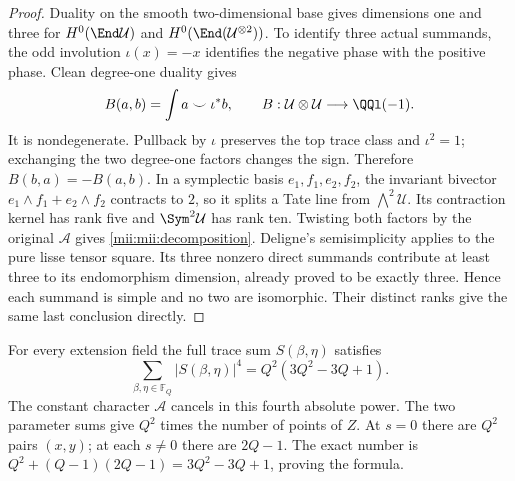 \begin{proof}
Duality on the smooth two-dimensional base gives dimensions one and
three for $H^0(\End\mathcal U)$ and
$H^0(\End(\mathcal U^{\otimes2}))$. To identify three actual
summands, the odd involution $\iota(x)=-x$ identifies the negative
phase with the positive phase. Clean degree-one duality gives
\[
 B(a,b)=\int a\smile\iota^*b,
 \qquad B:\mathcal U\otimes\mathcal U\longrightarrow\QQl(-1).
\]
It is nondegenerate. Pullback by $\iota$ preserves the top trace class
and $\iota^2=1$; exchanging the two degree-one factors changes the
sign. Therefore $B(b,a)=-B(a,b)$. In a symplectic basis
$e_1,f_1,e_2,f_2$, the invariant bivector
$e_1\wedge f_1+e_2\wedge f_2$ contracts to $2$, so it splits a
Tate line from $\bigwedge^2\mathcal U$. Its contraction kernel has
rank five and $\Sym^2\mathcal U$ has rank ten. Twisting both factors
by the original $\mathcal A$ gives \eqref{mii:mii:decomposition}.
Deligne's semisimplicity applies to the pure lisse tensor square.
Its three nonzero direct summands contribute at least three to its
endomorphism dimension, already proved to be exactly three. Hence
each summand is simple and no two are isomorphic. Their distinct
ranks give the same last conclusion directly.
\end{proof}

For every extension field the full trace sum $S(\beta,\eta)$ satisfies
\begin{equation}\tag{MII13}\label{mii:mii:moment4}
 \sum_{\beta,\eta\in\mathbb F_Q}|S(\beta,\eta)|^4
       =Q^2(3Q^2-3Q+1).
\end{equation}
The constant character $\mathcal A$ cancels in this fourth absolute
power. The two parameter sums give $Q^2$ times the number of points
of $Z$. At $s=0$ there are $Q^2$ pairs $(x,y)$; at each $s\ne0$
there are $2Q-1$. The exact number is
$Q^2+(Q-1)(2Q-1)=3Q^2-3Q+1$, proving the formula.

